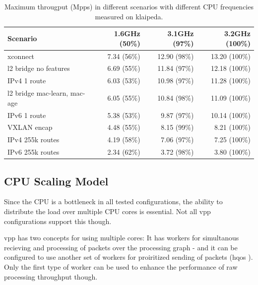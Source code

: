 

\begin{table}[!ht]
	\vspace{5ex}
	\begin{tabular}[]{ l r r r }
		Scenario & 1.6GHz (50\%) & 3.1GHz (97\%)  & 3.2GHz (100\%) \\ 
		\midrule
		xconnect & 7.34 (56\%) & 12.90 (98\%) & 13.20 (100\%) \\ %
		l2 bridge no features & 6.69 (55\%) & 11.84 (97\%) & 12.18 (100\%) \\ %
		IPv4 1 route & 6.03 (53\%) & 10.98 (97\%) & 11.28 (100\%) \\ %
		l2 bridge mac-learn, mac-age & 6.05 (55\%) & 10.84 (98\%) & 11.09 (100\%) \\ %
		IPv6 1 route & 5.38 (53\%) & 9.87 (97\%) & 10.14 (100\%) \\ %
		VXLAN encap & 4.48 (55\%) & 8.15 (99\%) & 8.21 (100\%) \\ %
		IPv4 255k routes & 4.19 (58\%) & 7.06 (97\%) & 7.25 (100\%) \\ %
		IPv6 255k routes & 2.34 (62\%) & 3.72 (98\%) & 3.80 (100\%) \\ %
		\midrule
	\end{tabular}
	\caption{Maximum througput (Mpps) in different scenarios with different CPU frequencies measured on klaipeda. }
	\label{bottleneck}
\end{table}


\subsection{CPU Scaling Model}

Since the CPU is a bottleneck in all tested configurations, the
ability to distribute the load over multiple CPU cores is
essential. Not all \Ac{vpp} configurations support this though.

\Ac{vpp} has two concepts for using multiple cores: It has workers for
simultanous recieving and processing of packets over the processing
graph - and it can be configured to use another set of workers for
proiritized sending of packets (\Ac{hqos} \cite{vppdocs:qos}
\cite{vppdocs:hqosplacement}). Only the first type of worker can be
used to enhance the performance of raw processing throughput though.

